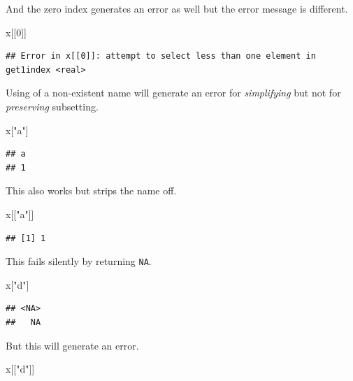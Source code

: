 \documentclass[
]{book}
\newenvironment{Shaded}{\begin{snugshade}}{\end{snugshade}}
\newcommand{\DecValTok}[1]{\textcolor[rgb]{0.00,0.00,0.81}{#1}}
\newcommand{\NormalTok}[1]{#1}
\newcommand{\StringTok}[1]{\textcolor[rgb]{0.31,0.60,0.02}{#1}}
\begin{document}
And the zero index generates an error as well but the error message is different.

\begin{Shaded}
\begin{Highlighting}[]
\NormalTok{x[[}\DecValTok{0}\NormalTok{]]}
\end{Highlighting}
\end{Shaded}

\begin{verbatim}
## Error in x[[0]]: attempt to select less than one element in get1index <real>
\end{verbatim}

Using of a non-existent name will generate an error for \emph{simplifying} but not for \emph{preserving} subsetting.

\begin{Shaded}
\begin{Highlighting}[]
\NormalTok{x[}\StringTok{"a"}\NormalTok{]}
\end{Highlighting}
\end{Shaded}

\begin{verbatim}
## a 
## 1
\end{verbatim}

This also works but strips the name off.

\begin{Shaded}
\begin{Highlighting}[]
\NormalTok{x[[}\StringTok{"a"}\NormalTok{]]}
\end{Highlighting}
\end{Shaded}

\begin{verbatim}
## [1] 1
\end{verbatim}

This fails silently by returning \texttt{NA}.

\begin{Shaded}
\begin{Highlighting}[]
\NormalTok{x[}\StringTok{"d"}\NormalTok{]}
\end{Highlighting}
\end{Shaded}

\begin{verbatim}
## <NA> 
##   NA
\end{verbatim}

But this will generate an error.

\begin{Shaded}
\begin{Highlighting}[]
\NormalTok{x[[}\StringTok{"d"}\NormalTok{]]}
\end{Highlighting}
\end{Shaded}
\end{document}
